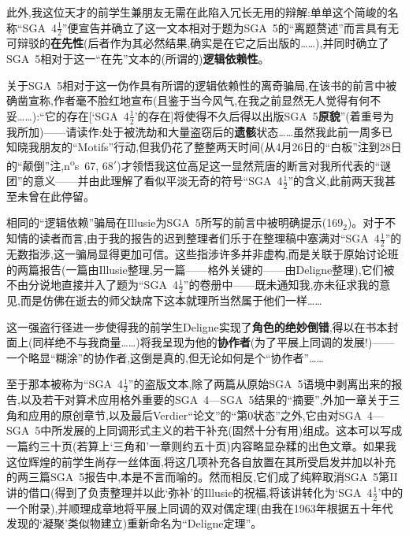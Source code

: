 此外,我这位天才的前学生兼朋友无需在此陷入冗长无用的辩解:单单这个简峻的名称“SGA~4$\frac{1}{2}$”\dmark{}便宣告并确立了这一文本相对于题为SGA~5的“离题赘述”而言具有无可辩驳的\textbf{在先性}(后者作为其必然结果,确实是在它之后出版的……),并同时确立了SGA~5相对于这一“在先”文本的(所谓的)\textbf{逻辑依赖性}。

关于SGA~5相对于这一伪作具有所谓的逻辑依赖性的离奇骗局,在该书的前言中被确凿宣称,作者毫不脸红地宣布(且鉴于当今风气,在我之前显然无人觉得有何不妥……):“它的存在[‘SGA~4$\frac{1}{2}$’的存在]将使得不久后得以出版SGA~5\textbf{原貌}”(着重号为我所加)——请读作:处于被洗劫和大量盗窃后的\textbf{遗骸}状态……虽然我此前一周多已知晓我朋友的“Motifs”行动,但我仍花了整整两天时间(从4月26日的“白板”注到28日的“颠倒”注,n\textsuperscript{o}s~67, 68$'$)才领悟我这位高足这一显然荒唐的断言对我所代表的“谜团”的意义——并由此理解了看似平淡无奇的符号“SGA~4$\frac{1}{2}$”的含义,此前两天我甚至未曾在此停留。

相同的“逻辑依赖”骗局在Illusie为SGA~5所写的前言中被明确提示(169$_2$)。对于不知情的读者而言,由于我的报告的迟到整理者们乐于在整理稿中塞满对“SGA~4$\frac{1}{2}$”的无数指涉,这一骗局显得更加可信。这些指涉许多并非虚构,而是关联于原始讨论班的两篇报告(一篇由Illusie整理,另一篇——格外关键的——由Deligne整理),它们被不由分说地直接并入了题为“SGA~4$\frac{1}{2}$”的卷册中——既未通知我,亦未征求我的意见,而是仿佛在逝去的师父缺席下这本就理所当然属于他们一样……

\dmark{}这一强盗行径进一步使得我的前学生Deligne实现了\textbf{角色的绝妙倒错},得以在书本封面上(同样绝不与我商量……)将我呈现为他的\textbf{协作者}(为了平展上同调的发展!)——一个略显“糊涂”的协作者,这倒是真的,但无论如何是个“协作者”……

至于那本被称为“SGA~4$\frac{1}{2}$”的盗版文本,除了两篇从原始SGA~5语境中剥离出来的报告,以及若干对算术应用格外重要的SGA~4—SGA~5结果的“摘要”,外加一章关于三角和应用的原创章节,以及最后Verdier“论文”的“第0状态”之外,它由对SGA~4—SGA~5中所发展的上同调形式主义的若干补充(固然十分有用)组成。这本可以写成一篇约三十页(若算上‘三角和’一章则约五十页)内容略显杂糅的出色文章。如果我这位辉煌的前学生尚存一丝体面,将这几项补充各自放置在其所受启发并加以补充的两三篇SGA~5报告中\dmark{},本是不言而喻的。然而相反,它们成了纯粹取消SGA~5第II讲的借口(得到了负责整理并以此‘弥补’的Illusie的祝福,将该讲转化为‘SGA~4$\frac{1}{2}$’中的一个附录),并顺理成章地将平展上同调的双对偶定理(由我在1963年根据五十年代发现的‘凝聚’类似物建立)重新命名为“Deligne定理”。

